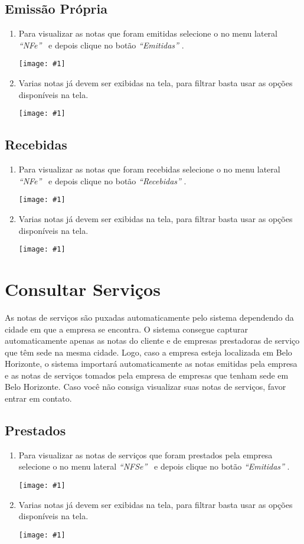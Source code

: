\documentclass{article}
\newcommand{\itasp}[1]{
  \textit{``#1''}
}
\newcommand{\imagem}[2]{
  \begin{center}
    \texttt{[image: \#1]}
  \end{center}
}
\begin{document}
  \subsection{Emissão Própria}
  \begin{enumerate}
    \item Para visualizar as notas que foram emitidas selecione o no menu lateral \itasp{NFe} \ e depois clique no botão \itasp{Emitidas}. \imagem{menu-nfe.PNG}{.25}
    \item Varias notas já devem ser exibidas na tela, para filtrar basta usar as opções disponíveis na tela. \imagem{filtro-nfe-emit.PNG}{1}
  \end{enumerate}
  
  \subsection{Recebidas}
  \begin{enumerate}
    \item Para visualizar as notas que foram recebidas selecione o no menu lateral \itasp{NFe} \ e depois clique no botão \itasp{Recebidas}. \imagem{menu-nfe.PNG}{.25}
    \item Varias notas já devem ser exibidas na tela, para filtrar basta usar as opções disponíveis na tela. \imagem{filtro-nfe-rec.PNG}{1}
  \end{enumerate}
  
  \section{Consultar Serviços}
  \label{sec:servicos-nfstock}
  As notas de serviços são puxadas automaticamente pelo sistema dependendo da cidade em que a empresa se encontra. O sistema consegue capturar automaticamente apenas as notas do cliente e de empresas prestadoras de serviço que têm sede na mesma cidade. Logo, caso a empresa esteja localizada em Belo Horizonte, o sistema importará automaticamente as notas emitidas pela empresa e as notas de serviços tomados pela empresa de empresas que tenham sede em Belo Horizonte. Caso você não consiga visualizar suas notas de serviços, favor entrar em contato.
  
  \subsection{Prestados}
  \begin{enumerate}
    \item Para visualizar as notas de serviços que foram prestados pela empresa selecione o no menu lateral \itasp{NFSe} \ e depois clique no botão \itasp{Emitidas}. \imagem{menu-nfe.PNG}{.2}
    \item Varias notas já devem ser exibidas na tela, para filtrar basta usar as opções disponíveis na tela. \imagem{filtro-nfse-emit.PNG}{.9}
  \end{enumerate}
  
\end{document}
